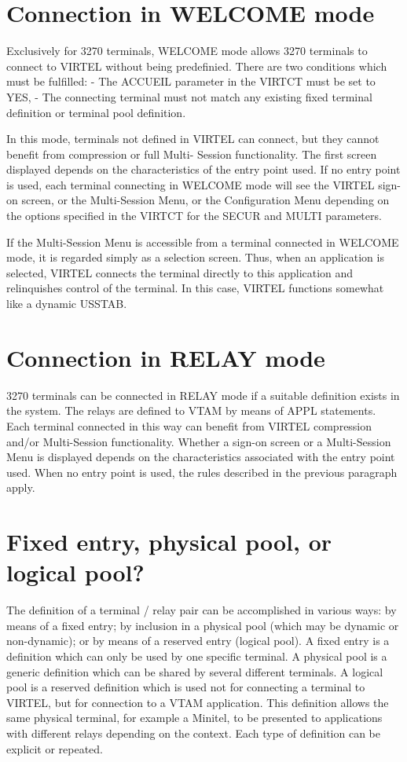 \documentclass[letterpaper,10pt,english]{sphinxmanual}
\begin{document}
\section{Connection in WELCOME mode}
\label{\detokenize{connectivity_guide:connection-in-welcome-mode}}
Exclusively for 3270 terminals, WELCOME mode allows 3270 terminals to connect to VIRTEL without being predefinied.
There are two conditions which must be fulfilled:
- The ACCUEIL parameter in the VIRTCT must be set to YES,
- The connecting terminal must not match any existing fixed terminal definition or terminal pool definition.

In this mode, terminals not defined in VIRTEL can connect, but they cannot benefit from compression or full Multi-
Session functionality. The first screen displayed depends on the characteristics of the entry point used. If no entry
point is used, each terminal connecting in WELCOME mode will see the VIRTEL sign-on screen, or the Multi-Session
Menu, or the Configuration Menu depending on the options specified in the VIRTCT for the SECUR and MULTI
parameters.

If the Multi-Session Menu is accessible from a terminal connected in WELCOME mode, it is regarded simply as a
selection screen. Thus, when an application is selected, VIRTEL connects the terminal directly to this application and
relinquishes control of the terminal. In this case, VIRTEL functions somewhat like a dynamic USSTAB.


\section{Connection in RELAY mode}
\label{\detokenize{connectivity_guide:connection-in-relay-mode}}
3270 terminals can be connected in RELAY mode if a suitable definition exists in the system. The relays are defined to VTAM by means of APPL statements. Each terminal connected in this way can benefit from VIRTEL compression and/or Multi-Session functionality. Whether a sign-on screen or a Multi-Session Menu is displayed depends on the characteristics associated with the entry point used. When no entry point is used, the rules described in the previous paragraph apply.


\section{Fixed entry, physical pool, or logical pool?}
\label{\detokenize{connectivity_guide:fixed-entry-physical-pool-or-logical-pool}}
The definition of a terminal / relay pair can be accomplished in various ways: by means of a fixed entry; by inclusion in a physical pool (which may be dynamic or non-dynamic); or by means of a reserved entry (logical pool). A fixed entry is a definition which can only be used by one specific terminal. A physical pool is a generic definition which can be shared by several different terminals. A logical pool is a reserved definition which is used not for connecting a terminal to VIRTEL, but for connection to a VTAM application. This definition allows the same physical terminal, for example a Minitel, to be presented to applications with different relays depending on the context. Each type of definition can be explicit or repeated.
\end{document}
